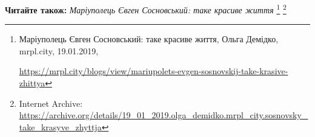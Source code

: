  
 
 
 
 

\textbf{Читайте також:} \emph{Маріуполець Євген Сосновський: таке красиве життя}%
\footnote{Маріуполець Євген Сосновський: таке красиве життя, Ольга Демідко, mrpl.city, 19.01.2019, \par%
\url{https://mrpl.city/blogs/view/mariupolets-evgen-sosnovskij-take-krasive-zhittya}%
} %
\footnote{Internet Archive: \url{https://archive.org/details/19_01_2019.olga_demidko.mrpl_city.sosnovsky_take_krasyve_zhyttja}}
